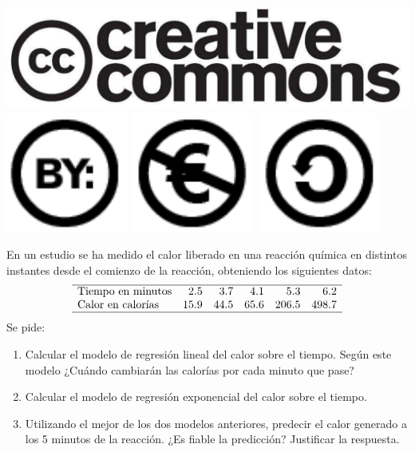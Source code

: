 \documentclass[aspectratio=149,10pt,xcolor=dvipsnames,t]{beamer}
\begin{document}
\begin{frame}[c]
\begin{center}
\biskip
\includegraphics[scale=0.07]{img/cc-logo}
\includegraphics[scale=0.2]{img/cc-by}
\includegraphics[scale=0.2]{img/cc-e}
\includegraphics[scale=0.2]{img/cc-c}
\end{center}
\end{frame}

\begin{frame}[c]
\large
En un estudio se ha medido el calor liberado en una reacción química en distintos instantes
desde el comienzo de la reacción, obteniendo los siguientes datos:
\[
\begin{array}{lrrrrr}
\hline
\textrm{Tiempo en minutos} & 2.5 & 3.7 & 4.1 & 5.3 & 6.2 \\
\textrm{Calor en calorías} & 15.9 & 44.5 & 65.6 & 206.5 & 498.7\\
\hline
\end{array}
\]
Se pide:
\begin{enumerate}
\item Calcular el modelo de regresión lineal del calor sobre el tiempo. 
Según este modelo ¿Cuándo cambiarán las calorías por cada minuto que pase?
\item Calcular el modelo de regresión exponencial del calor sobre el tiempo.
\item Utilizando el mejor de los dos modelos anteriores, predecir el calor generado a los 5 minutos de la reacción. ¿Es
fiable la predicción? Justificar la respuesta. 
\end{enumerate}
\end{frame}
\end{document}
